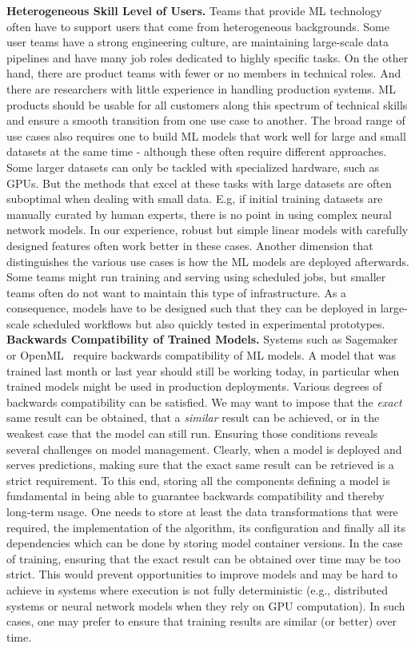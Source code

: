 \documentclass[11pt]{article}
\newcommand{\hdr}[1]{\noindent\textbf{#1.}}
\begin{document}
\hdr{Heterogeneous Skill Level of Users} Teams that provide ML technology often have to support users that come from heterogeneous backgrounds. Some user teams have a strong engineering culture, are maintaining large-scale data pipelines and have many job roles dedicated to highly specific tasks. On the other hand, there are product teams with fewer or no members in technical roles. And there are researchers with little experience in handling production systems. ML products should be usable for all customers along this spectrum of technical skills and ensure a smooth transition from one use case to another. The broad range of use cases also requires one to build ML models that work well for large and small datasets at the same time - although these often require different approaches. Some larger datasets can only be tackled with specialized hardware, such as GPUs. But the methods that excel at these tasks with large datasets are often suboptimal when dealing with small data. E.g, if initial training datasets are manually curated by human experts, there is no point in using complex neural network models. In our experience, robust but simple linear models with carefully designed features often work better in these cases. Another dimension that distinguishes the various use cases is how the ML models are deployed afterwards. Some teams might run training and serving using scheduled jobs, but smaller teams often do not want to maintain this type of infrastructure. As a consequence, models have to be designed such that they can be deployed in large-scale scheduled workflows but also quickly tested in experimental prototypes.\\ 

\hdr{Backwards Compatibility of Trained Models} Systems such as Sagemaker~\cite{janu2018} or OpenML~\cite{Vanschoren2014} require backwards compatibility of ML models. A model that was trained last month or last year should still be working today, in particular when trained models might be used in production deployments. Various degrees of backwards compatibility can be satisfied. We may want to impose that the \emph{exact} same result can be obtained, that a \emph{similar} result can be achieved, or in the weakest case that the model can still run. Ensuring those conditions reveals several challenges on model management. Clearly, when a model is deployed and serves predictions, making sure that the exact same result can be retrieved is a strict requirement. To this end, storing all the components defining a model is fundamental in being able to guarantee backwards compatibility and thereby long-term usage. One needs to store at least the data transformations that were required, the implementation of the algorithm, its configuration and finally all its dependencies which can be done by storing model container versions. In the case of training, ensuring that the exact result can be obtained over time may be too strict. This would prevent opportunities to improve models and may be hard to achieve in systems where execution is not fully deterministic (e.g., distributed systems or neural network models when they rely on GPU computation). In such cases, one may prefer to ensure that training results are similar (or better) over time. 
\end{document}
